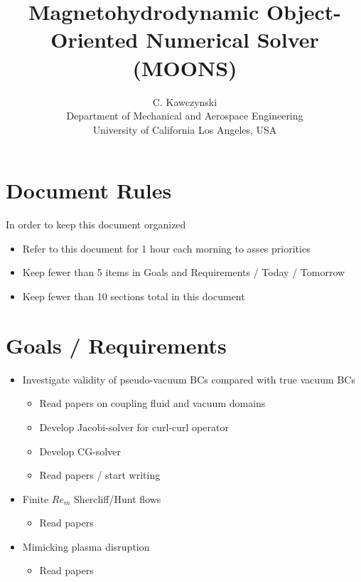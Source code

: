 \documentclass[11pt]{article}
\begin{document}
\doublespacing
\title{Magnetohydrodynamic Object-Oriented Numerical Solver (MOONS)}
\author{C. Kawczynski \\
Department of Mechanical and Aerospace Engineering \\
University of California Los Angeles, USA\\
}
\maketitle

\section{Document Rules}
In order to keep this document organized
\begin{itemize}
\item Refer to this document for 1 hour each morning to asses priorities
\item Keep fewer than 5 items in Goals and Requirements / Today / Tomorrow
\item Keep fewer than 10 sections total in this document
\end{itemize}

\section{Goals / Requirements}

\begin{itemize}
\item Investigate validity of pseudo-vacuum BCs compared with true vacuum BCs
	\begin{itemize}
	\item Read papers on coupling fluid and vacuum domains
	\item Develop Jacobi-solver for curl-curl operator
	\item Develop CG-solver
	\item Read papers / start writing
	\end{itemize}
\item Finite $Re_m$ Shercliff/Hunt flows
	\begin{itemize}
	\item Read papers
	\end{itemize}
\item Mimicking plasma disruption
	\begin{itemize}
	\item Read papers
	\end{itemize}
\end{itemize}
\end{document}
